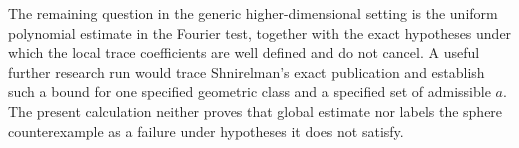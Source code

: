 The remaining question in the generic higher-dimensional setting is
the uniform polynomial estimate in the Fourier test, together with
the exact hypotheses under which the local trace coefficients are
well defined and do not cancel. A useful further research run would
trace Shnirelman's exact publication and establish such a bound for
one specified geometric class and a specified set of admissible
\(a\). The present calculation neither proves that global estimate
nor labels the sphere counterexample as a failure under hypotheses
it does not satisfy.
